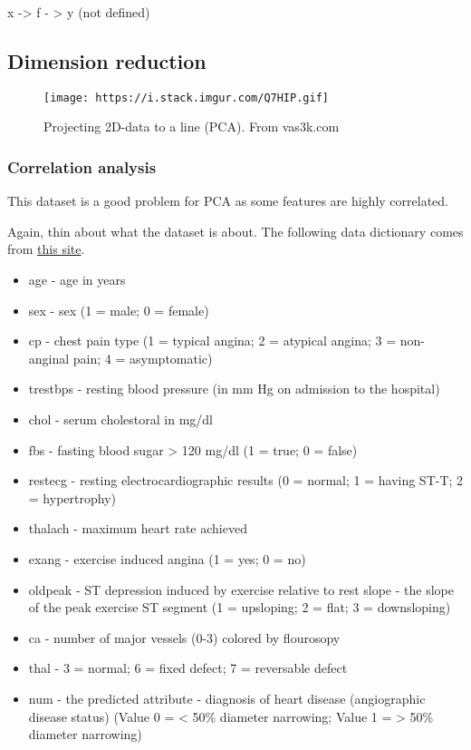 \documentclass[
]{book}
\providecommand{\tightlist}{%
  \setlength{\itemsep}{0pt}\setlength{\parskip}{0pt}}
\begin{document}
x -\textgreater{} f - \textgreater{} y (not defined)

\hypertarget{dimension-reduction}{%
\subsection{Dimension reduction}\label{dimension-reduction}}

\begin{figure}
\centering
\texttt{[image: https://i.stack.imgur.com/Q7HIP.gif]}
\caption{Projecting 2D-data to a line (PCA). From vas3k.com}
\end{figure}

\hypertarget{correlation-analysis}{%
\subsubsection{Correlation analysis}\label{correlation-analysis}}

This dataset is a good problem for PCA as some features are highly correlated.

Again, thin about what the dataset is about. The following data dictionary comes from \href{http://rstudio-pubs-static.s3.amazonaws.com/24341_184a58191486470cab97acdbbfe78ed5.html}{this site}.

\begin{itemize}
\tightlist
\item
  age - age in years
\item
  sex - sex (1 = male; 0 = female)
\item
  cp - chest pain type (1 = typical angina; 2 = atypical angina; 3 = non-anginal pain; 4 = asymptomatic)
\item
  trestbps - resting blood pressure (in mm Hg on admission to the hospital)
\item
  chol - serum cholestoral in mg/dl
\item
  fbs - fasting blood sugar \textgreater{} 120 mg/dl (1 = true; 0 = false)
\item
  restecg - resting electrocardiographic results (0 = normal; 1 = having ST-T; 2 = hypertrophy)
\item
  thalach - maximum heart rate achieved
\item
  exang - exercise induced angina (1 = yes; 0 = no)
\item
  oldpeak - ST depression induced by exercise relative to rest
  slope - the slope of the peak exercise ST segment (1 = upsloping; 2 = flat; 3 = downsloping)
\item
  ca - number of major vessels (0-3) colored by flourosopy
\item
  thal - 3 = normal; 6 = fixed defect; 7 = reversable defect
\item
  num - the predicted attribute - diagnosis of heart disease (angiographic disease status) (Value 0 = \textless{} 50\% diameter narrowing; Value 1 = \textgreater{} 50\% diameter narrowing)
\end{itemize}
\end{document}
